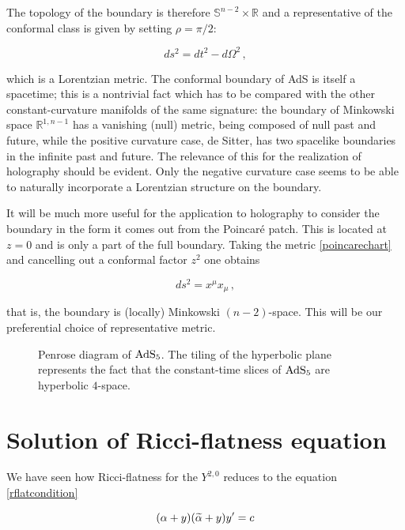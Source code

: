 The topology of the boundary is therefore $\mathbb{S}^{n-2} \times \mathbb{R}$ and a representative of the conformal class is given by setting $\rho = \pi/2$:

\begin{equation}
	ds^2 = dt^2 - d\Omega^2 \,,
\end{equation}

which is a Lorentzian metric. The conformal boundary of AdS is itself a spacetime; this is a nontrivial fact which has to be compared with the other constant-curvature manifolds of the same signature: the boundary of Minkowski space $\mathbb{R}^{1,n-1}$ has a vanishing (null) metric, being composed of null past and future, while the positive curvature case, de Sitter, has two spacelike boundaries in the infinite past and future. The relevance of this for the realization of holography should be evident. Only the negative curvature case seems to be able to naturally incorporate a Lorentzian structure on the boundary.

It will be much more useful for the application to holography to consider the boundary in the form it comes out from the Poincaré patch. This is located at $z=0$ and is only a part of the full boundary. Taking the metric \ref{poincarechart} and cancelling out a conformal factor $z^2$ one obtains

\begin{equation}
	ds^2 = x^\mu x_\mu\,,
\end{equation}

that is, the boundary is (locally) Minkowski $(n-2)$-space. This will be our preferential choice of representative metric.

\begin{figure}
\centering
\def\svgwidth{200pt}
\captionsetup{width=0.8\textwidth}

\caption{Penrose diagram of $\operatorname{AdS}_{5}$. The tiling of the hyperbolic plane represents the fact that the constant-time slices of $\operatorname{AdS}_{5}$ are hyperbolic $4$-space.}
\end{figure}


\section{Solution of Ricci-flatness equation}\label{appendix:solutioncubic}

We have seen how Ricci-flatness for the $Y^{2,0}$ reduces to the equation \eqref{rflatcondition}

\begin{equation}\label{rflatcondition2}
	(\alpha+y)(\widetilde{\alpha} + y) y' = c
\end{equation}

